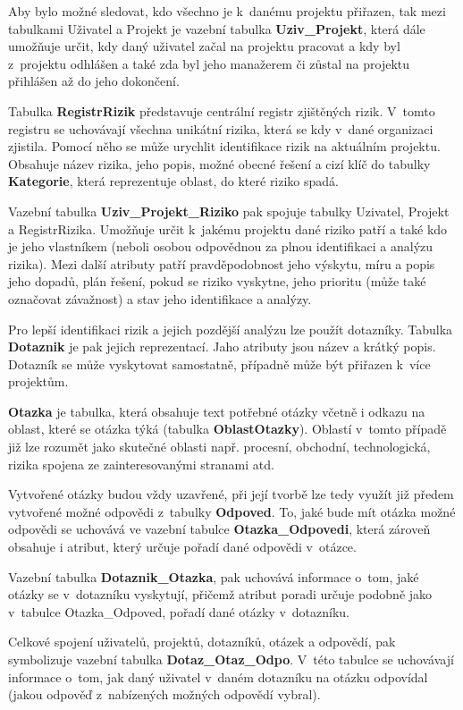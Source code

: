 Aby bylo možné sledovat, kdo všechno je k~danému projektu přiřazen, tak mezi tabulkami Uživatel a Projekt je vazební tabulka \textbf{Uziv\_Projekt}, která dále umožňuje určit, kdy daný uživatel začal na projektu pracovat a kdy byl z~projektu odhlášen a také zda byl jeho manažerem či zůstal na projektu přihlášen až do jeho dokončení.

Tabulka \textbf{RegistrRizik} představuje centrální registr zjištěných rizik. V~tomto registru se uchovávají všechna unikátní rizika, která se kdy v~dané organizaci zjistila. Pomocí něho se může urychlit identifikace rizik na aktuálním projektu. Obsahuje název  rizika, jeho popis, možné obecné řešení a cizí klíč do tabulky \textbf{Kategorie}, která reprezentuje oblast, do které riziko spadá.

Vazební tabulka \textbf{Uziv\_Projekt\_Riziko} pak spojuje tabulky Uzivatel, Projekt a RegistrRizika. Umožňuje určit k~jakému projektu dané riziko patří a také kdo je jeho vlastníkem (neboli osobou odpovědnou za plnou identifikaci a analýzu rizika). Mezi další atributy patří pravděpodobnost jeho výskytu, míru a popis jeho dopadů, plán řešení, pokud se riziko vyskytne, jeho prioritu (může také označovat závažnost) a stav jeho identifikace a analýzy.

Pro lepší identifikaci rizik a jejich pozdější analýzu lze použít dotazníky. Tabulka \textbf{Dotaznik} je pak jejich reprezentací. Jaho atributy jsou název a krátký popis. Dotazník se může vyskytovat samostatně, případně může být přiřazen k~více projektům.

\textbf{Otazka} je tabulka, která obsahuje text potřebné otázky včetně i odkazu na oblast, které se otázka týká (tabulka \textbf{OblastOtazky}). Oblastí v~tomto případě již lze rozumět jako skutečné oblasti např. procesní, obchodní, technologická, rizika spojena ze zainteresovanými stranami atd.

Vytvořené otázky budou vždy uzavřené, při její tvorbě lze tedy využít již předem vytvořené možné odpovědi z~tabulky \textbf{Odpoved}. To, jaké bude mít otázka možné odpovědi se uchovává ve vazební tabulce \textbf{Otazka\_Odpovedi}, která zároveň obsahuje i atribut, který určuje pořadí dané odpovědi v~otázce.

Vazební tabulka \textbf{Dotaznik\_Otazka}, pak uchovává informace o~tom, jaké otázky se v~dotazníku vyskytují, přičemž atribut poradi určuje podobně jako v~tabulce Otazka\_Odpoved, pořadí dané otázky v~dotazníku. 

Celkové spojení uživatelů, projektů, dotazníků, otázek a odpovědí, pak symbolizuje vazební tabulka \textbf{Dotaz\_Otaz\_Odpo}. V~této tabulce se uchovávají informace o~tom, jak daný uživatel v~daném dotazníku na otázku odpovídal (jakou odpověď z~nabízených možných odpovědí vybral).

